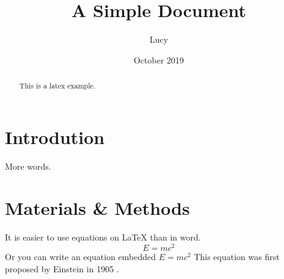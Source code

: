 \documentclass[12pt]{article}
\title{A Simple Document}
\author{Lucy}
\date{October 2019}
\begin{document}
	\maketitle
	
	\begin{abstract}
		This is a latex example.
	\end{abstract}
	
	\section{Introdution}
		More words.
	
	\section{Materials \& Methods}
		It is easier to use equations on LaTeX than in word.
		\begin{equation}
		E=mc^2
		\end{equation}
		Or you can write an equation embedded $E=mc^{2}$
		This equation was first proposed by Einstein in 1905 \cite{einstein1905does}.
	
	
	
	
\end{document}
